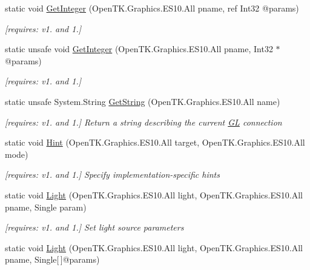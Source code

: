 \begin{DoxyCompactItemize}
static void \hyperlink{class_open_t_k_1_1_graphics_1_1_e_s10_1_1_g_l_af1a943d8a2071cbda03a5bd4606c6f35}{Get\-Integer} (Open\-T\-K.\-Graphics.\-E\-S10.\-All pname, ref Int32 @params)
\begin{DoxyCompactList}\small\item\em \mbox{[}requires\-: v1. and 1.\mbox{]}\end{DoxyCompactList}\item 
static unsafe void \hyperlink{class_open_t_k_1_1_graphics_1_1_e_s10_1_1_g_l_af18db67363f55007eea0ae45e7a11940}{Get\-Integer} (Open\-T\-K.\-Graphics.\-E\-S10.\-All pname, Int32 $\ast$@params)
\begin{DoxyCompactList}\small\item\em \mbox{[}requires\-: v1. and 1.\mbox{]}\end{DoxyCompactList}\item 
static unsafe System.\-String \hyperlink{class_open_t_k_1_1_graphics_1_1_e_s10_1_1_g_l_abfc1da2f0e2cd7d6ae28945389b707f3}{Get\-String} (Open\-T\-K.\-Graphics.\-E\-S10.\-All name)
\begin{DoxyCompactList}\small\item\em \mbox{[}requires\-: v1. and 1.\mbox{]} Return a string describing the current \hyperlink{class_open_t_k_1_1_graphics_1_1_e_s10_1_1_g_l}{G\-L} connection \end{DoxyCompactList}\item 
static void \hyperlink{class_open_t_k_1_1_graphics_1_1_e_s10_1_1_g_l_ab946cf410853955fbd51447c7e95241e}{Hint} (Open\-T\-K.\-Graphics.\-E\-S10.\-All target, Open\-T\-K.\-Graphics.\-E\-S10.\-All mode)
\begin{DoxyCompactList}\small\item\em \mbox{[}requires\-: v1. and 1.\mbox{]} Specify implementation-\/specific hints \end{DoxyCompactList}\item 
static void \hyperlink{class_open_t_k_1_1_graphics_1_1_e_s10_1_1_g_l_a6ed5740981c5ec41dc0a1f8b3951ece1}{Light} (Open\-T\-K.\-Graphics.\-E\-S10.\-All light, Open\-T\-K.\-Graphics.\-E\-S10.\-All pname, Single param)
\begin{DoxyCompactList}\small\item\em \mbox{[}requires\-: v1. and 1.\mbox{]} Set light source parameters \end{DoxyCompactList}\item 
static void \hyperlink{class_open_t_k_1_1_graphics_1_1_e_s10_1_1_g_l_a92bcb80a607e327be50e16645cd856c1}{Light} (Open\-T\-K.\-Graphics.\-E\-S10.\-All light, Open\-T\-K.\-Graphics.\-E\-S10.\-All pname, Single\mbox{[}$\,$\mbox{]}@params)

\end{DoxyCompactItemize}
